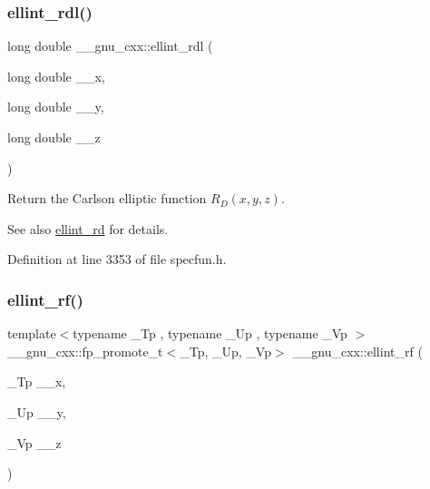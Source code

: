 \subsubsection{\texorpdfstring{ellint\+\_\+rdl()}{ellint\_rdl()}}
{\footnotesize\ttfamily long double \+\_\+\+\_\+gnu\+\_\+cxx\+::ellint\+\_\+rdl (\begin{DoxyParamCaption}\item[{long double}]{\+\_\+\+\_\+x,  }\item[{long double}]{\+\_\+\+\_\+y,  }\item[{long double}]{\+\_\+\+\_\+z }\end{DoxyParamCaption})\hspace{0.3cm}{\ttfamily [inline]}}

Return the Carlson elliptic function $ R_D(x,y,z) $.

\begin{DoxySeeAlso}{See also}
\hyperlink{group__gnu__math__spec__func_gad29dae6abc783c8fe952dba477e65309}{ellint\+\_\+rd} for details. 
\end{DoxySeeAlso}


Definition at line 3353 of file specfun.\+h.

\mbox{\label{group__gnu__math__spec__func_gae4859494464c7eaf98193f92b2235bc1}} 
\subsubsection{\texorpdfstring{ellint\+\_\+rf()}{ellint\_rf()}}
{\footnotesize\ttfamily template$<$typename \+\_\+\+Tp , typename \+\_\+\+Up , typename \+\_\+\+Vp $>$ \\
\+\_\+\+\_\+gnu\+\_\+cxx\+::fp\+\_\+promote\+\_\+t$<$\+\_\+\+Tp, \+\_\+\+Up, \+\_\+\+Vp$>$ \+\_\+\+\_\+gnu\+\_\+cxx\+::ellint\+\_\+rf (\begin{DoxyParamCaption}\item[{\+\_\+\+Tp}]{\+\_\+\+\_\+x,  }\item[{\+\_\+\+Up}]{\+\_\+\+\_\+y,  }\item[{\+\_\+\+Vp}]{\+\_\+\+\_\+z }\end{DoxyParamCaption})\hspace{0.3cm}{\ttfamily [inline]}}

